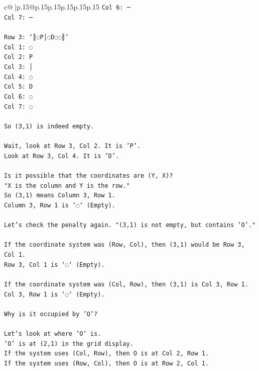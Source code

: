 \documentclass{article}
\begin{document}
{\begin{supertabular}{c@{$\;$}|p{.15\linewidth}@{}p{.15\linewidth}p{.15\linewidth}p{.15\linewidth}p{.15\linewidth}p{.15\linewidth}}
{{{\texttt{Col 6: ─} \\
\texttt{Col 7: ─} \\
\\ 
\texttt{Row 3: `║◌P│◌D◌◌║`} \\
\texttt{Col 1: ◌} \\
\texttt{Col 2: P} \\
\texttt{Col 3: │} \\
\texttt{Col 4: ◌} \\
\texttt{Col 5: D} \\
\texttt{Col 6: ◌} \\
\texttt{Col 7: ◌} \\
\\ 
\texttt{So (3,1) is indeed empty.} \\
\\ 
\texttt{Wait, look at Row 3, Col 2. It is 'P'.} \\
\texttt{Look at Row 3, Col 4. It is 'D'.} \\
\\ 
\texttt{Is it possible that the coordinates are (Y, X)?} \\
\texttt{"X is the column and Y is the row."} \\
\texttt{So (3,1) means Column 3, Row 1.} \\
\texttt{Column 3, Row 1 is `◌` (Empty).} \\
\\ 
\texttt{Let's check the penalty again. "(3,1) is not empty, but contains 'O'."} \\
\\ 
\texttt{If the coordinate system was (Row, Col), then (3,1) would be Row 3, Col 1.} \\
\texttt{Row 3, Col 1 is `◌` (Empty).} \\
\\ 
\texttt{If the coordinate system was (Col, Row), then (3,1) is Col 3, Row 1.} \\
\texttt{Col 3, Row 1 is `◌` (Empty).} \\
\\ 
\texttt{Why is it occupied by 'O'?} \\
\\ 
\texttt{Let's look at where 'O' is.} \\
\texttt{'O' is at (2,1) in the grid display.} \\
\texttt{If the system uses (Col, Row), then O is at Col 2, Row 1.} \\
\texttt{If the system uses (Row, Col), then O is at Row 2, Col 1.} \\
}}}
\end{supertabular}}
\end{document}
